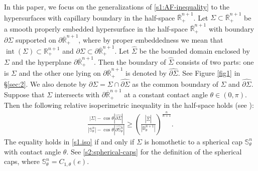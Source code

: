\documentclass[11pt,reqno]{amsart}
\theoremstyle{definition}
\theoremstyle{remark}
\numberwithin{equation}{section}
\renewcommand{\(}{\left(}
\renewcommand{\)}{\right)}
\renewcommand{\-}{\overline}
\begin{document}
In this paper, we focus on the generalizations of \eqref{s1:AF-inequality} to the hypersurfaces with capillary boundary in the half-space $\overline{\mathbb{R}}_+^{n+1}$. Let $\Sigma\subset \-{\mathbb R}^{n+1}_{+}$ be a smooth properly embedded hypersurface in the half-space $\-{\mathbb R}^{n+1}_{+}$ with boundary $\partial \Sigma$ supported on $\partial \-{\mathbb R}^{n+1}_{+}$, where by proper embeddedness we mean that $\operatorname{int}(\Sigma)\subset \mathbb R^{n+1}_{+}$ and $\partial \Sigma \subset \partial \-{\mathbb R}^{n+1}_{+}$. Let $\widehat{\Sigma}$ be the bounded domain enclosed by $\Sigma$ and the hyperplane $\partial\-{\mathbb R}^{n+1}_{+}$. Then the boundary of $\widehat{\Sigma}$ consists of two parts: one is $\Sigma$ and the other one lying on $\partial \overline{\mathbb{R}}^{n+1}_+$ is denoted by $\widehat{\partial\Sigma}$. See Figure \ref{fig1} in \S \ref{sec:2}. We also denote by $\partial\Sigma=\Sigma\cap \widehat{\partial\Sigma}$ as the common boundary of $\Sigma$ and $\widehat{\partial\Sigma}$. Suppose that $\Sigma$ intersects with $\partial \overline{\mathbb{R}}_+^{n+1}$ at a constant contact angle $\theta\in (0,\pi)$. Then the following relative isoperimetric inequality in the half-space holds (see \cite[\S 19.3]{Maggi}):
\begin{align}\label{s1.iso}
\frac{|\Sigma|-\cos\theta |\widehat{\partial\Sigma}|}{|\mathbb S^n_{\theta}|-\cos\theta|\widehat{\partial \mathbb{S}^n_\theta}|} \geq \(\frac{|\widehat{\Sigma}|}{|\mathbb B_{\theta}^{n+1}|}\)^\frac{n}{n+1}.
\end{align}
The equality holds in \eqref{s1.iso} if and only if $\Sigma$ is homothetic to a spherical cap $\mathbb S^n_{\theta}$ with contact angle $\theta$. See \eqref{s2:spherical-caps} for the definition of the spherical caps, where $\mathbb S^n_{\theta}=C_{1,\theta}(e)$.
\end{document}
